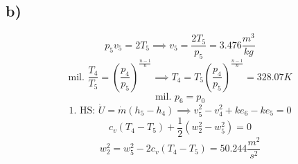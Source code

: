 

\subsection*{b)}
\[
p_5 v_5 = 2 T_5 \implies v_5 = \frac{2 T_5}{p_5} = 3.476 \frac{m^3}{kg}
\]
\[
\text{mil. } \frac{T_4}{T_5} = \left( \frac{p_4}{p_5} \right)^{\frac{n-1}{n}} \implies T_4 = T_5 \left( \frac{p_4}{p_5} \right)^{\frac{n-1}{n}} = 328.07 K
\]
\[
\text{mil. } p_6 = p_0
\]
\[
1. \text{ HS: } \dot{U} = \dot{m} \left( h_5 - h_4 \right) \implies v_5^2 - v_4^2 + ke_6 - ke_5 = 0
\]
\[
c_v \left( T_4 - T_5 \right) + \frac{1}{2} \left( w_2^2 - w_5^2 \right) = 0
\]
\[
w_2^2 = w_5^2 - 2 c_v \left( T_4 - T_5 \right) = 50.244 \frac{m^2}{s^2}
\]